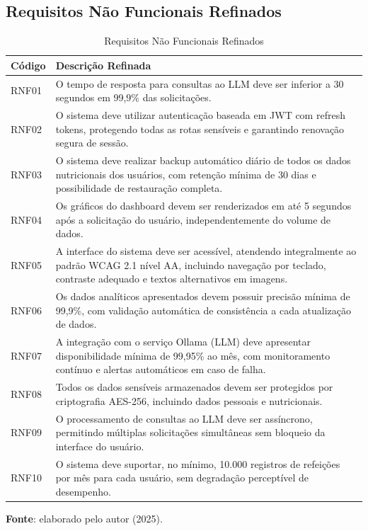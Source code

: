 \subsection{Requisitos Não Funcionais Refinados}

\begin{longtable}{|l|p{}|}
\caption{Requisitos Não Funcionais Refinados}
\label{tab:reqs-naofuncionais-refinados}\\
\hline
\textbf{Código} & \textbf{Descrição Refinada} \\
\hline
\endfirsthead
\endhead
RNF01 & O tempo de resposta para consultas ao LLM deve ser inferior a 30 segundos em 99,9\% das solicitações. \\
\hline
RNF02 & O sistema deve utilizar autenticação baseada em JWT com refresh tokens, protegendo todas as rotas sensíveis e garantindo renovação segura de sessão. \\
\hline
RNF03 & O sistema deve realizar backup automático diário de todos os dados nutricionais dos usuários, com retenção mínima de 30 dias e possibilidade de restauração completa. \\
\hline
RNF04 & Os gráficos do dashboard devem ser renderizados em até 5 segundos após a solicitação do usuário, independentemente do volume de dados. \\
\hline
RNF05 & A interface do sistema deve ser acessível, atendendo integralmente ao padrão WCAG 2.1 nível AA, incluindo navegação por teclado, contraste adequado e textos alternativos em imagens. \\
\hline
RNF06 & Os dados analíticos apresentados devem possuir precisão mínima de 99,9\%, com validação automática de consistência a cada atualização de dados. \\
\hline
RNF07 & A integração com o serviço Ollama (LLM) deve apresentar disponibilidade mínima de 99,95\% ao mês, com monitoramento contínuo e alertas automáticos em caso de falha. \\
\hline
RNF08 & Todos os dados sensíveis armazenados devem ser protegidos por criptografia AES-256, incluindo dados pessoais e nutricionais. \\
\hline
RNF09 & O processamento de consultas ao LLM deve ser assíncrono, permitindo múltiplas solicitações simultâneas sem bloqueio da interface do usuário. \\
\hline
RNF10 & O sistema deve suportar, no mínimo, 10.000 registros de refeições por mês para cada usuário, sem degradação perceptível de desempenho. \\
\hline
\end{longtable}

\begin{center}
    \small{\textbf{Fonte}: elaborado pelo autor (2025).}
\end{center}
